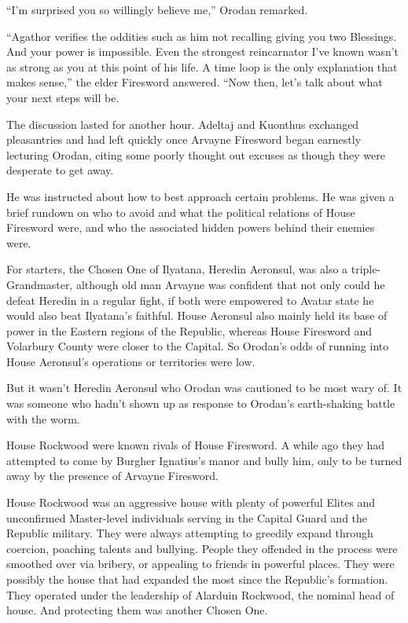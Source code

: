 \documentclass[a4paper,10pt]{book}
\begin{document}
“I’m surprised you so willingly believe me,” Orodan remarked.\par
“Agathor verifies the oddities such as him not recalling giving you two Blessings. And your power is impossible. Even the strongest reincarnator I’ve known wasn’t as strong as you at this point of his life. A time loop is the only explanation that makes sense,” the elder Firesword answered. “Now then, let’s talk about what your next steps will be.\par
\par
The discussion lasted for another hour. Adeltaj and Kuonthus exchanged pleasantries and had left quickly once Arvayne Firesword began earnestly lecturing Orodan, citing some poorly thought out excuses as though they were desperate to get away.\par
He was instructed about how to best approach certain problems. He was given a brief rundown on who to avoid and what the political relations of House Firesword were, and who the associated hidden powers behind their enemies were.\par
For starters, the Chosen One of Ilyatana, Heredin Aeronsul, was also a triple-Grandmaster, although old man Arvayne was confident that not only could he defeat Heredin in a regular fight, if both were empowered to Avatar state he would also beat Ilyatana’s faithful. House Aeronsul also mainly held its base of power in the Eastern regions of the Republic, whereas House Firesword and Volarbury County were closer to the Capital. So Orodan's odds of running into House Aeronsul's operations or territories were low.\par
But it wasn’t Heredin Aeronsul who Orodan was cautioned to be most wary of. It was someone who hadn’t shown up as response to Orodan’s earth-shaking battle with the worm.\par
House Rockwood were known rivals of House Firesword. A while ago they had attempted to come by Burgher Ignatius’s manor and bully him, only to be turned away by the presence of Arvayne Firesword.\par
House Rockwood was an aggressive house with plenty of powerful Elites and unconfirmed Master-level individuals serving in the Capital Guard and the Republic military. They were always attempting to greedily expand through coercion, poaching talents and bullying. People they offended in the process were smoothed over via bribery, or appealing to friends in powerful places. They were possibly the house that had expanded the most since the Republic’s formation. They operated under the leadership of Alarduin Rockwood, the nominal head of house. And protecting them was another Chosen One.\par
\end{document}
